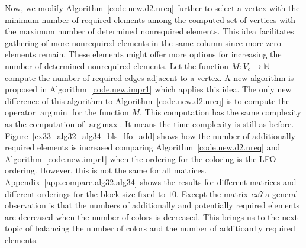 \documentclass[12pt, twoside,a4paper,toc=bibliography]{scrbook}
\DeclareMathOperator*{\argmin}{arg\,min}
\DeclareMathOperator*{\argmax}{arg\,max}
\newcommand{\figref}[1]{Figure~\protect\ref{#1}}
\newcommand{\coderef}[1]{Algorithm~\protect\ref{#1}}
\newcommand{\appref}[1]{Appendix~\protect\ref{#1}}
\newcommand{\req}{M}
\begin{document}
Now, we modify \coderef{code.new.d2.nreq} further to select a vertex with the minimum number of 
required elements among the computed set of vertices with the maximum number of determined nonrequired elements.
This idea facilitates gathering of more nonrequired elements in the same column since
more zero elements remain. These elements might offer more options for increasing the number of determined
nonrequired elements.
Let the function $\req: V_c\rightarrow \mathbb{N}$ compute the number of required edges adjacent to a vertex.
A new algorithm is proposed in \coderef{code.new.impr1} which applies this idea. 
The only new difference of this algorithm to \coderef{code.new.d2.nreq} 
is to compute the operator $\argmin$ for the 
function $\req$. This computation has the same complexity as the computation of $\argmax$.
It means the time complexity is still as before.
\figref{ex33_alg32_alg34_bls_lfo_add} shows how the number of additionally
required elements is increased comparing
\coderef{code.new.d2.nreq} and \coderef{code.new.impr1} when the ordering for the coloring
is the LFO ordering. However, this is not the same for all matrices. 
\appref{app.compare.alg32.alg34} shows the results for different matrices
and different orderings for the block size fixed to $10$.
Except the matrix \textit{ex7}
a general observation is that the numbers of additionally and potentially required elements
are decreased when the number of colors is decreased.
This brings us to the next topic of balancing the number of colors
and the number of additioanlly required elements.
\end{document}
